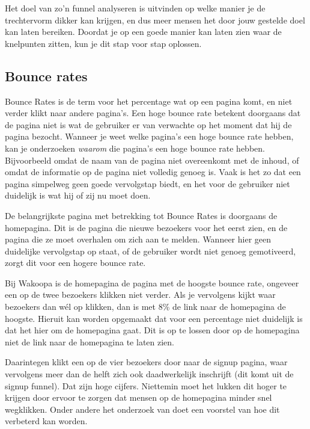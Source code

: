 \documentclass[a4paper, 10pt, pdftex]{report}
\begin{document}
    Het doel van zo'n funnel analyseren is uitvinden op welke manier je de trechtervorm dikker kan krijgen, en dus meer mensen het door jouw gestelde doel kan laten bereiken. Doordat je op een goede manier kan laten zien waar de knelpunten zitten, kun je dit stap voor stap oplossen.

    \subsection{Bounce rates}
    Bounce Rates is de term voor het percentage wat op een pagina komt, en niet verder klikt naar andere pagina's. Een hoge bounce rate betekent doorgaans dat de pagina niet is wat de gebruiker er van verwachte op het moment dat hij de pagina bezocht. Wanneer je weet welke pagina's een hoge bounce rate hebben, kan je onderzoeken \emph{waarom} die pagina's een hoge bounce rate hebben. Bijvoorbeeld omdat de naam van de pagina niet overeenkomt met de inhoud, of omdat de informatie op de pagina niet volledig genoeg is. Vaak is het zo dat een pagina simpelweg geen goede vervolgstap biedt, en het voor de gebruiker niet duidelijk is wat hij of zij nu moet doen.

    De belangrijkste pagina met betrekking tot Bounce Rates is doorgaans de homepagina. Dit is de pagina die nieuwe bezoekers voor het eerst zien, en de pagina die ze moet overhalen om zich aan te melden. Wanneer hier geen duidelijke vervolgstap op staat, of de gebruiker wordt niet genoeg gemotiveerd, zorgt dit voor een hogere bounce rate.

    Bij Wakoopa is de homepagina de pagina met de hoogste bounce rate, ongeveer een op de twee bezoekers klikken niet verder. Als je vervolgens kijkt waar bezoekers dan w\'el op klikken, dan is met 8\% de link naar de homepagina de hoogste. Hieruit kan worden opgemaakt dat voor een percentage niet duidelijk is dat het hier om de homepagina gaat. Dit is op te lossen door op de homepagina niet de link naar de homepagina te laten zien.

    Daarintegen klikt een op de vier bezoekers door naar de signup pagina, waar vervolgens meer dan de helft zich ook daadwerkelijk inschrijft (dit komt uit de signup funnel). Dat zijn hoge cijfers. Niettemin moet het lukken dit hoger te krijgen door ervoor te zorgen dat mensen op de homepagina minder snel wegklikken. Onder andere het onderzoek van \cite{Hoekman2008} doet een voorstel van hoe dit verbeterd kan worden.
\end{document}

